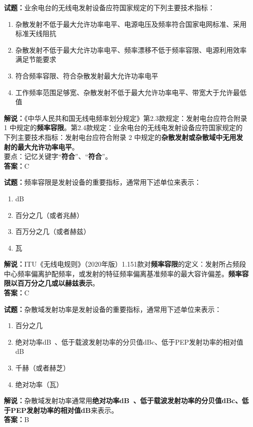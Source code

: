 \documentclass{ctexbook}
\begin{document}
\bigskip

\noindent\textbf{试题：}业余电台的无线电发射设备应符国家规定的下列主要技术指标：
\begin{enumerate}[leftmargin=3em]
  \item 杂散发射不低于最大允许功率电平、电源电压及频率符合国家电网标准、采用标准天线阻抗
  \item 杂散发射不低于最大允许功率电平、频率漂移不低于频率容限、电源利用效率满足节能要求
  \item 符合频率容限、符合杂散发射最大允许功率电平
  \item 工作频率范围足够宽、杂散发射不低于最大允许功率电平、带宽大于允许最低值
\end{enumerate}
\noindent\textbf{解说：}《中华人民共和国无线电频率划分规定》第2.3款规定：发射电台应符合附录 1 中规定的\textbf{频率容限}。第2.4款规定：业余电台的无线电发射设备应符国家规定的下列主要技术指标：发射电台应符合附录 2 中规定的\textbf{杂散发射或杂散域中无用发射的最大允许功率电平}。\\要点：记忆关键字“\textbf{符合}”、“\textbf{符合}”。\\\noindent\textbf{答案：}C

\bigskip

\noindent\textbf{试题：}频率容限是发射设备的重要指标，通常用下述单位来表示：
\begin{enumerate}[leftmargin=3em]
  \item dB
  \item 百分之几（或者兆赫）
  \item 百万分之几（或者赫兹）
  \item 瓦
\end{enumerate}
\noindent\textbf{解说：}ITU《无线电规则》（2020年版）1.151款对\textbf{频率容限}的定义：发射所占频段中心频率偏离护配频率，或发射的特征频率偏离基准频率的最大容许偏差。\textbf{频率容限以百万分之几或以赫兹表示}。\\\noindent\textbf{答案：}C

\bigskip

\noindent\textbf{试题：}杂散域发射功率是发射设备的重要指标，通常用下述单位来表示：
\begin{enumerate}[leftmargin=3em]
  \item 百分之几
  \item 绝对功率\unit[qualifier-mode=combine]{\deci\bel{}}、低于载波发射功率的分贝值dBc、低于PEP发射功率的相对值dB
  \item 千赫（或者赫芝）
  \item 绝对功率（瓦）
\end{enumerate}
\noindent\textbf{解说：}杂散域发射功率通常用\textbf{绝对功率\unit[qualifier-mode=combine]{\deci\bel{}}、低于载波发射功率的分贝值dBc、低于PEP发射功率的相对值dB}来表示。\\\noindent\textbf{答案：}B
\end{document}
